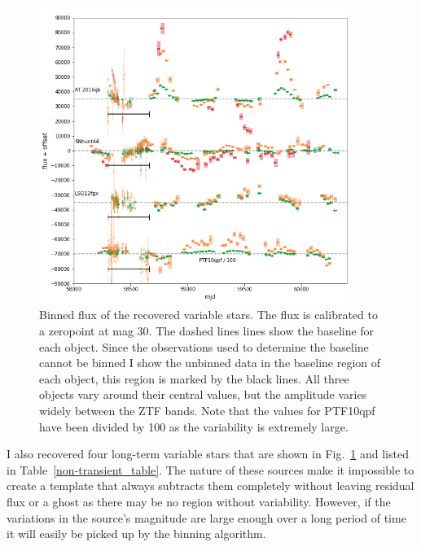 \documentclass[a4paper,oneside,12pt, class=Latex/Classes/PhDthesisPSnPDF, crop=false]{standalone}
\begin{document}
\begin{figure}[h!]
    \centering
    \includegraphics[width=0.9\textwidth]{../Images/chapter_4/non-transients_varstar.png}
    \caption{Binned flux of the recovered variable stars. The flux is calibrated to a zeropoint at mag 30. The dashed lines lines show the baseline for each object. Since the observations used to determine the baseline cannot be binned I show the unbinned data in the baseline region of each object, this region is marked by the black lines. All three objects vary around their central values, but the amplitude varies widely between the ZTF bands. Note that the values for PTF10qpf have been divided by 100 as the variability is extremely large.}
    \label{non-transients_varstar}
\end{figure}

I also recovered four long-term variable stars that are shown in Fig.~\ref{non-transients_varstar} and listed in Table~\ref{non-transient_table}. The nature of these sources make it impossible to create a template that always subtracts them completely without leaving residual flux or a ghost as there may be no region without variability. However, if the variations in the source's magnitude are large enough over a long period of time it will easily be picked up by the binning algorithm.
\end{document}
